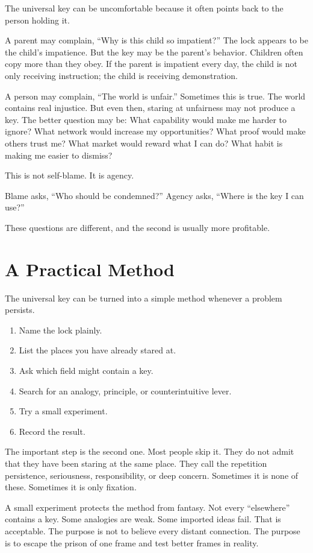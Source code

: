 The universal key can be uncomfortable because it often points back to the person holding it.

A parent may complain, ``Why is this child so impatient?'' The lock appears to be the child's impatience. But the key may be the parent's behavior. Children often copy more than they obey. If the parent is impatient every day, the child is not only receiving instruction; the child is receiving demonstration.

A person may complain, ``The world is unfair.'' Sometimes this is true. The world contains real injustice. But even then, staring at unfairness may not produce a key. The better question may be: What capability would make me harder to ignore? What network would increase my opportunities? What proof would make others trust me? What market would reward what I can do? What habit is making me easier to dismiss?

This is not self-blame. It is agency.

Blame asks, ``Who should be condemned?'' Agency asks, ``Where is the key I can use?''

These questions are different, and the second is usually more profitable.

\section*{A Practical Method}

The universal key can be turned into a simple method whenever a problem persists.

\begin{enumerate}
\item Name the lock plainly.
\item List the places you have already stared at.
\item Ask which field might contain a key.
\item Search for an analogy, principle, or counterintuitive lever.
\item Try a small experiment.
\item Record the result.
\end{enumerate}

The important step is the second one. Most people skip it. They do not admit that they have been staring at the same place. They call the repetition persistence, seriousness, responsibility, or deep concern. Sometimes it is none of these. Sometimes it is only fixation.

A small experiment protects the method from fantasy. Not every ``elsewhere'' contains a key. Some analogies are weak. Some imported ideas fail. That is acceptable. The purpose is not to believe every distant connection. The purpose is to escape the prison of one frame and test better frames in reality.


